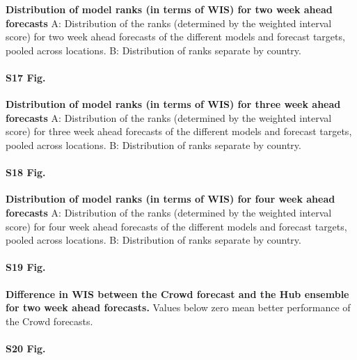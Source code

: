 \documentclass[10pt,letterpaper]{article}
\begin{document}
\textbf{Distribution of model ranks (in terms of WIS) for two week ahead forecasts}
A: Distribution of the ranks (determined by the weighted interval score)
for two week ahead forecasts of the different models and forecast
targets, pooled across locations. B: Distribution of ranks separate by
country.

\paragraph{S17 Fig.}
\label{A: Distribution of the ranks (determined by the weighted interval score) for three week ahead forecasts of the different models and forecast targets, pooled across locations. B: Distribution of ranks separate by country.}

\textbf{Distribution of model ranks (in terms of WIS) for three week ahead forecasts}
A: Distribution of the ranks (determined by the weighted interval score)
for three week ahead forecasts of the different models and forecast
targets, pooled across locations. B: Distribution of ranks separate by
country.

\paragraph{S18 Fig.}
\label{A: Distribution of the ranks (determined by the weighted interval score) for four week ahead forecasts of the different models and forecast targets, pooled across locations. B: Distribution of ranks separate by country.}

\textbf{Distribution of model ranks (in terms of WIS) for four week ahead forecasts}
A: Distribution of the ranks (determined by the weighted interval score)
for four week ahead forecasts of the different models and forecast
targets, pooled across locations. B: Distribution of ranks separate by
country.

\paragraph{S19 Fig.}
\label{fig:distribution-scores-differences}

\textbf{Difference in WIS between the Crowd forecast and the Hub ensemble for two week ahead forecasts.}
Values below zero mean better performance of the Crowd forecasts.

\paragraph{S20 Fig.}
\label{fig:distribution-scores-differences-renewal}
\end{document}
